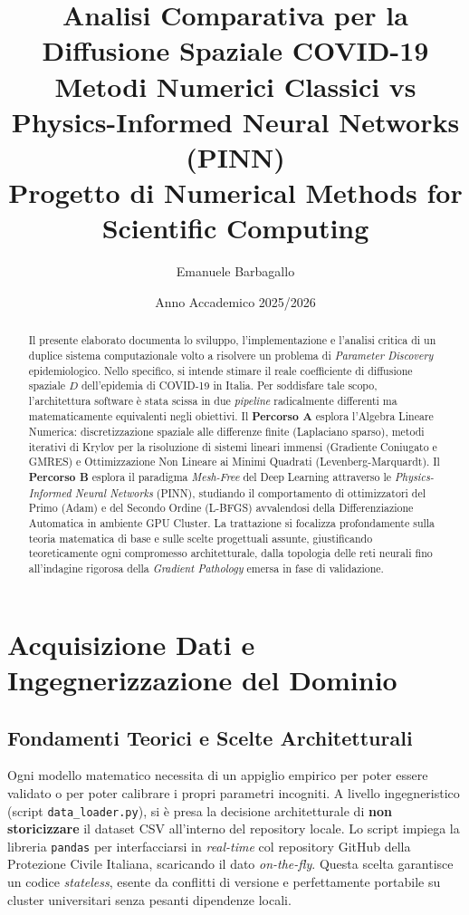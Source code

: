 \documentclass[12pt,a4paper]{report}
\title{
    \Huge\textbf{Analisi Comparativa per la Diffusione Spaziale COVID-19}\\
    \vspace{0.5cm}
    \Large{Metodi Numerici Classici vs Physics-Informed Neural Networks (PINN)}\\
    \vspace{1cm}
    \large{Progetto di Numerical Methods for Scientific Computing}
}
\author{Emanuele Barbagallo}
\date{Anno Accademico 2025/2026}
\begin{document}
\maketitle

\begin{abstract}
Il presente elaborato documenta lo sviluppo, l'implementazione e l'analisi critica di un duplice sistema computazionale volto a risolvere un problema di \textit{Parameter Discovery} epidemiologico. Nello specifico, si intende stimare il reale coefficiente di diffusione spaziale $D$ dell'epidemia di COVID-19 in Italia. 
Per soddisfare tale scopo, l'architettura software è stata scissa in due \textit{pipeline} radicalmente differenti ma matematicamente equivalenti negli obiettivi. 
Il \textbf{Percorso A} esplora l'Algebra Lineare Numerica: discretizzazione spaziale alle differenze finite (Laplaciano sparso), metodi iterativi di Krylov per la risoluzione di sistemi lineari immensi (Gradiente Coniugato e GMRES) e Ottimizzazione Non Lineare ai Minimi Quadrati (Levenberg-Marquardt). 
Il \textbf{Percorso B} esplora il paradigma \textit{Mesh-Free} del Deep Learning attraverso le \textit{Physics-Informed Neural Networks} (PINN), studiando il comportamento di ottimizzatori del Primo (Adam) e del Secondo Ordine (L-BFGS) avvalendosi della Differenziazione Automatica in ambiente GPU Cluster.
La trattazione si focalizza profondamente sulla teoria matematica di base e sulle scelte progettuali assunte, giustificando teoreticamente ogni compromesso architetturale, dalla topologia delle reti neurali fino all'indagine rigorosa della \textit{Gradient Pathology} emersa in fase di validazione.
\end{abstract}

\tableofcontents

\chapter{Acquisizione Dati e Ingegnerizzazione del Dominio}

\section{Fondamenti Teorici e Scelte Architetturali}
Ogni modello matematico necessita di un appiglio empirico per poter essere validato o per poter calibrare i propri parametri incogniti. 
A livello ingegneristico (script \texttt{data\_loader.py}), si è presa la decisione architetturale di \textbf{non storicizzare} il dataset CSV all'interno del repository locale. Lo script impiega la libreria \texttt{pandas} per interfacciarsi in \textit{real-time} col repository GitHub della Protezione Civile Italiana, scaricando il dato \textit{on-the-fly}. Questa scelta garantisce un codice \textit{stateless}, esente da conflitti di versione e perfettamente portabile su cluster universitari senza pesanti dipendenze locali.
\end{document}
